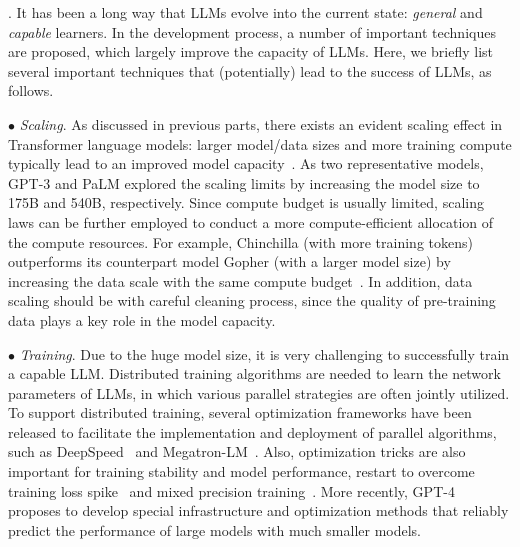 . It has been a long way that LLMs evolve into the current state:  \emph{general} and \emph{capable} learners.  
In the development process, a number of important techniques are proposed, which largely improve the capacity of LLMs.   
Here, we briefly list several important techniques that (potentially)  lead to the success of LLMs, as follows. 

$\bullet$ \emph{Scaling}. As discussed in previous parts, there exists an evident scaling effect in Transformer language models:   larger model/data sizes and more training compute typically lead to an improved model capacity~\cite{Kaplan-arxiv-2020-Scaling,Hoffmann-arxiv-2022-Training}. 
As two representative models,  GPT-3 and PaLM explored the scaling limits  by increasing the model size to 175B and 540B, respectively. Since compute budget is usually limited,  scaling laws can be further  employed to conduct a more compute-efficient allocation of the compute resources.  
For example,  Chinchilla (with more training tokens) outperforms its 
counterpart model Gopher (with a larger model size) by increasing the data scale with the same compute budget~\cite{Hoffmann-arxiv-2022-Training}. 
In addition,  data scaling should be with careful cleaning process,  since the quality of pre-training data plays a key role in the model capacity. 



$\bullet$ \emph{Training}. Due to the huge model size, it is very challenging to successfully train a capable LLM. Distributed training algorithms are needed to learn
the network parameters of LLMs, in which various parallel strategies  are often jointly utilized. To support distributed training, several optimization frameworks have been released to facilitate the implementation and deployment of parallel algorithms, such as DeepSpeed~\cite{Rasley-KDD-2020-DeepSpeed} and Megatron-LM~\cite{Shoeybi-arXiv-2019-Megatron, Narayanan-ACM-2021-Efficient, Korthikanti-arxiv-2022-reducing}. Also, optimization tricks are also important for training stability and model performance, \eg  restart to overcome  training loss spike~\cite{Chowdhery-arxiv-2022-PaLM} and mixed precision training~\cite{Scao-arxiv-2022-BLOOM}. 
More recently, GPT-4~\cite{OpenAI-OpenAI-2023-GPT-4} proposes to develop special infrastructure and optimization methods that reliably predict the performance of large models with much smaller models. 


